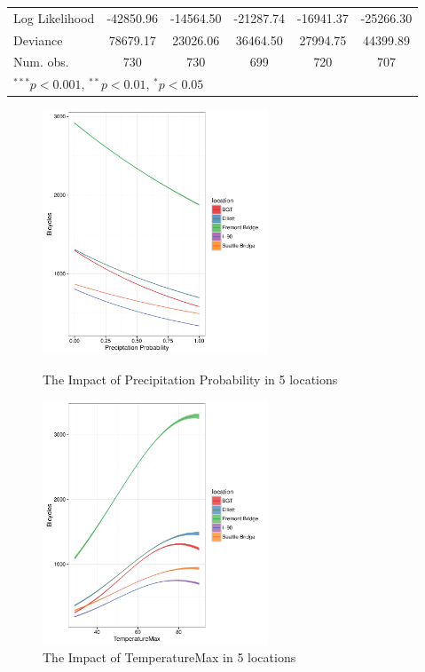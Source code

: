 \documentclass [11pt, proquest] {uwthesis}[2015/03/03]
\begin{document}
\begin{table}
\begin{center}
\begin{tabular}{l c c c c c }
Log Likelihood & -42850.96     & -14564.50     & -21287.74     & -16941.37     & -25266.30     \\
Deviance       & 78679.17      & 23026.06      & 36464.50      & 27994.75      & 44399.89      \\
Num. obs.      & 730           & 730           & 699           & 720           & 707           \\
\hline
\multicolumn{6}{l}{\scriptsize{$^{***}p<0.001$, $^{**}p<0.01$, $^*p<0.05$}}
\end{tabular}
\label{tbl:multilocations}
\end{center}
\end{table}


\begin{figure}
  \centering
    \includegraphics[width=0.6\textwidth]{figures/5sites/Sim_precip} 
    \label{fig:Sim_precip}
  \caption{The Impact of Precipitation Probability in 5 locations }
\end{figure}


\begin{figure}
  \centering
  \includegraphics[width=0.6\textwidth]{figures/5sites/Sim_temp} 
 \caption{The Impact of TemperatureMax in 5 locations }
 \label{fig:Sim_temp}
\end{figure}
\end{document}
